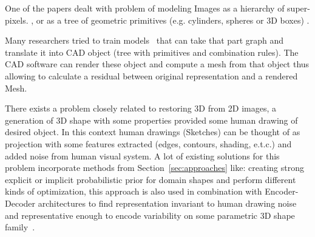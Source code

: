 One of the papers dealt with problem of modeling Images as a hierarchy of super-pixels. \cite{russell2009associative}, or as a tree of geometric primitives (e.g. cylinders, spheres or 3D boxes) \cite{li2017grass}.

Many researchers tried to train models~\cite{avetisyan2019scan2cad,Izadinia_2017_CVPR} that can take that part graph and translate it into CAD object (tree with primitives and combination rules). The CAD software can render these object and compute a mesh from that object thus allowing to calculate a residual between original representation and a rendered Mesh.

There exists a problem closely related to restoring 3D from 2D images, a generation of 3D shape with some properties provided some human drawing of desired object. In this context human drawings (Sketches) can be thought of as projection with some features extracted (edges, contours, shading, e.t.c.) and added noise from human visual system.
A lot of existing solutions for this problem incorporate methods from Section~\ref{sec:approaches} like: creating strong explicit or implicit probabilistic prior for domain shapes and perform different kinds of optimization, this approach is also used in combination with Encoder-Decoder architectures to find representation invariant to human drawing noise and representative enough to encode variability on some parametric 3D shape family~\cite{han2017deepsketch2face,xu2014true2form,kulkarni2014inverse}.